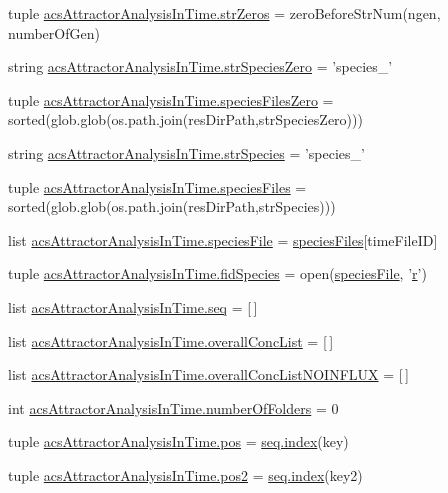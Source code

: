 \begin{DoxyCompactItemize}
\item 
tuple \hyperlink{a00123_a9401cc8fb642e77e034e21ef9babcb24}{acs\-Attractor\-Analysis\-In\-Time.\-str\-Zeros} = zero\-Before\-Str\-Num(ngen, number\-Of\-Gen)
\item 
string \hyperlink{a00123_aea2d717887265b294c623099d2495d4f}{acs\-Attractor\-Analysis\-In\-Time.\-str\-Species\-Zero} = 'species\-\_\-'
\item 
tuple \hyperlink{a00123_a4657fd3a80cf1c76ab075d62d8de3bf3}{acs\-Attractor\-Analysis\-In\-Time.\-species\-Files\-Zero} = sorted(glob.\-glob(os.\-path.\-join(res\-Dir\-Path,str\-Species\-Zero)))
\item 
string \hyperlink{a00123_ac1f05e7db61bcc83ea1ed27460462202}{acs\-Attractor\-Analysis\-In\-Time.\-str\-Species} = 'species\-\_\-'
\item 
tuple \hyperlink{a00123_a18645475f8596346ca431e99661b5674}{acs\-Attractor\-Analysis\-In\-Time.\-species\-Files} = sorted(glob.\-glob(os.\-path.\-join(res\-Dir\-Path,str\-Species)))
\item 
list \hyperlink{a00123_a3c620554bbf7ae30d97a60565fea8d1e}{acs\-Attractor\-Analysis\-In\-Time.\-species\-File} = \hyperlink{a00028_af5703745c2c2a6af7f62da460994d9c2}{species\-Files}\mbox{[}time\-File\-I\-D\mbox{]}
\item 
tuple \hyperlink{a00123_a70d70b9ab98e722475b03465c7f8dbbe}{acs\-Attractor\-Analysis\-In\-Time.\-fid\-Species} = open(\hyperlink{a00027_a7da0c82834970c5f3c3d9224ab832577}{species\-File}, '\hyperlink{a00031_ac862e7284527eb913b1351c8bfb8e079}{r}')
\item 
list \hyperlink{a00123_a1bdf98839177836f238806755e46ac3c}{acs\-Attractor\-Analysis\-In\-Time.\-seq} = \mbox{[}$\,$\mbox{]}
\item 
list \hyperlink{a00123_a2cebadd75179c46e551a2facbdd2741b}{acs\-Attractor\-Analysis\-In\-Time.\-overall\-Conc\-List} = \mbox{[}$\,$\mbox{]}
\item 
list \hyperlink{a00123_ad7eab833592c6cd395f9e2416dd13920}{acs\-Attractor\-Analysis\-In\-Time.\-overall\-Conc\-List\-N\-O\-I\-N\-F\-L\-U\-X} = \mbox{[}$\,$\mbox{]}
\item 
int \hyperlink{a00123_a3a2fe097086bb0f4a505fca8f53dc2b0}{acs\-Attractor\-Analysis\-In\-Time.\-number\-Of\-Folders} = 0
\item 
tuple \hyperlink{a00123_aa39692272363cd6f687c4b2a53f96594}{acs\-Attractor\-Analysis\-In\-Time.\-pos} = \hyperlink{a00102_a0cd6a44ffb07342cbc7e5ac33bfc9495}{seq.\-index}(key)
\item 
tuple \hyperlink{a00123_a49fec7e1deea4728b5ef4a487d155de9}{acs\-Attractor\-Analysis\-In\-Time.\-pos2} = \hyperlink{a00102_a0cd6a44ffb07342cbc7e5ac33bfc9495}{seq.\-index}(key2)

\end{DoxyCompactItemize}
